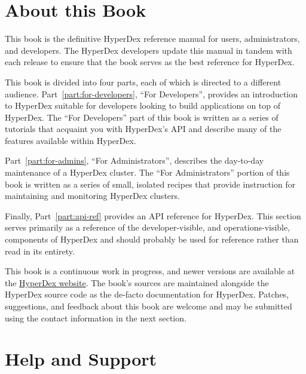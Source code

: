 \section{About this Book}
\label{sec:introduction:about}

This book is the definitive HyperDex reference manual for users, administrators,
and developers.  The HyperDex developers update this manual in tandem with each
release to ensure that the book serves as the best reference for HyperDex.

This book is divided into four parts, each of which is directed to a different
audience.  Part~\ref{part:for-developers}, ``For Developers'', provides an
introduction to HyperDex suitable for developers looking to build applications
on top of HyperDex.  The ``For Developers'' part of this book is written as a
series of tutorials that acquaint you with HyperDex's API and describe many of
the features available within HyperDex.

Part~\ref{part:for-admins}, ``For Administrators'', describes the day-to-day
maintenance of a HyperDex cluster.  The ``For Administrators'' portion of this
book is written as a series of small, isolated recipes that provide instruction
for maintaining and monitoring HyperDex clusters.


Finally, Part~\ref{part:api-ref} provides an API reference for HyperDex.  This
section serves primarily as a reference of the developer-visible, and
operations-visible, components of HyperDex and should probably be used for
reference rather than read in its entirety.

This book is a continuous work in progress, and newer versions are available at
the \href{http://hyperdex.org/}{HyperDex website}.  The book's sources are
maintained alongside the HyperDex source code as the de-facto documentation for
HyperDex.  Patches, suggestions, and feedback about this book are welcome and
may be submitted using the contact information in the next section.

\section{Help and Support}
\label{sec:introduction:support}

